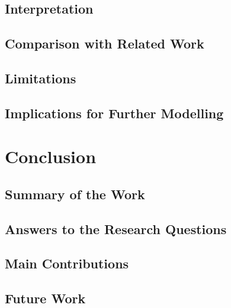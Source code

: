 \documentclass[logo,msc]{Original/infthesis}           %
\begin{document}
\section{Interpretation}

\section{Comparison with Related Work}

\section{Limitations}

\section{Implications for Further Modelling}

\chapter{Conclusion}

\section{Summary of the Work}

\section{Answers to the Research Questions}

\section{Main Contributions}

\section{Future Work}





\appendix
\end{document}
